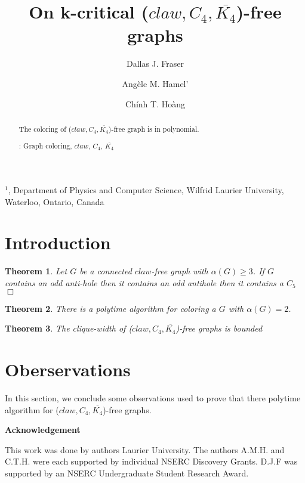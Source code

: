 \documentclass[12pt]{article}
\title{On k-critical ($claw, C_4, \overline{K_4}$)-free graphs}
\author{
	Dallas J. Fraser\inst{1}
	\and Ang\`ele M. Hamel'\inst{1}
	\and Ch\'inh T. Ho\`ang\inst{1}
}
\newtheorem{Theorem}{Theorem}[section]
\def\inst#1{$^{#1}$}
\def\FAM{($claw, C_4, \overline{K_4}$)}
\begin{document}
\maketitle

\begin{center}
{\footnotesize

\inst{1}, Department of Physics and Computer Science, Wilfrid Laurier
University, \\Waterloo, Ontario, Canada}

\end{center}

\begin{abstract}
The coloring of {\FAM}-free graph is in polynomial.

: Graph coloring, $claw$, $C_4$, $\overline{K_4}$
\end{abstract}


\section{Introduction}\label{sec:intro}

\begin{Theorem}\label{thm:ben-rebea}
Let $G$ be a connected $claw$-free graph with $\alpha(G) \geq 3$. If $G$ contains an odd anti-hole then it contains an odd antihole then it contains a $C_5$ $\Box$
\end{Theorem}

\begin{Theorem}\label{thm:alpha-two-poly}
There is a polytime algorithm for coloring a $G$ with $\alpha(G) =2$.
 \end{Theorem}

\begin{Theorem}\label{thm:bounded-clique}
The clique-width of {\FAM}-free graphs is bounded
\end{Theorem}


\section{Oberservations}\label{sec:observations}
In this section, we conclude some observations used to prove that there polytime algorithm for {\FAM}-free graphs.


\begin{center}
{\bf Acknowledgement}
\end{center}
This work was done by authors  Laurier University. The authors A.M.H. and C.T.H. were each supported by individual NSERC Discovery Grants. D.J.F was supported by an NSERC Undergraduate Student Research Award.


\clearpage
\begin{thebibliography}{99}

\end{thebibliography}
\end{document}
